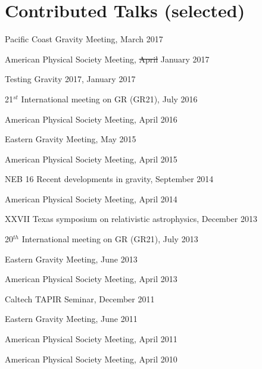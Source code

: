 \section{\sc Contributed Talks (selected)}
\begin{etaremune}
\item
  Pacific Coast Gravity Meeting,
  \hfill{}
  March 2017
\item
  American Physical Society Meeting,
  \hfill{}
  \sout{April} January 2017
\item
  Testing Gravity 2017,
  \hfill{}
  January 2017
\item
  21$^{st}$ International meeting on GR (GR21),
  \hfill{}
  July 2016
\item
  American Physical Society Meeting,
  \hfill{}
  April 2016
\item
  Eastern Gravity Meeting,
  \hfill{}
  May 2015
\item
  American Physical Society Meeting,
  \hfill{}
  April 2015
\item
  NEB 16 Recent developments in gravity,
  \hfill{}
  September 2014
\item
  American Physical Society Meeting,
  \hfill{}
  April 2014
\item
  XXVII Texas symposium on relativistic astrophysics,
  \hfill{}
  December 2013
\item
  20$^{th}$ International meeting on GR (GR21),
  \hfill{}
  July 2013
\item
  Eastern Gravity Meeting,
  \hfill{}
  June 2013
\item
  American Physical Society Meeting,
  \hfill{}
  April 2013
\item
  Caltech TAPIR Seminar,
  \hfill{}
  December 2011
\item
  Eastern Gravity Meeting,
  \hfill{}
  June 2011
\item
  American Physical Society Meeting,
  \hfill{}
  April 2011
\item
  American Physical Society Meeting,
  \hfill{}
  April 2010
\end{etaremune}


